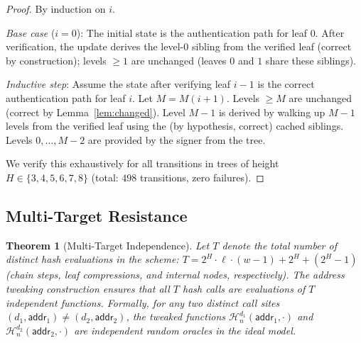 \documentclass[11pt]{article}
\newtheorem{theorem}{Theorem}
\newcommand{\hash}{\mathcal{H}}
\begin{document}
\begin{proof}
By induction on $i$.

\emph{Base case} ($i = 0$): The initial state is the authentication
path for leaf $0$. After verification, the update derives the level-$0$
sibling from the verified leaf (correct by construction); levels $\geq
1$ are unchanged (leaves $0$ and $1$ share these siblings).

\emph{Inductive step}: Assume the state after verifying leaf $i - 1$ is
the correct authentication path for leaf $i$. Let $M = M(i + 1)$.
Levels $\geq M$ are unchanged (correct by Lemma~\ref{lem:changed}).
Level $M - 1$ is derived by walking up $M - 1$ levels from the verified
leaf using the (by hypothesis, correct) cached siblings. Levels
$0, \ldots, M - 2$ are provided by the signer from the tree.

We verify this exhaustively for all transitions in trees of height
$H \in \{3, 4, 5, 6, 7, 8\}$ (total: $498$ transitions, zero
failures).
\end{proof}

\subsection{Multi-Target Resistance}

\begin{theorem}[Multi-Target Independence]\label{thm:multitarget}
Let $T$ denote the total number of distinct hash evaluations in the
scheme: $T = 2^H \cdot \ell \cdot (w - 1) + 2^H + (2^H - 1)$ (chain
steps, leaf compressions, and internal nodes, respectively). The
address tweaking construction ensures that all $T$ hash calls are
evaluations of $T$ \emph{independent functions}. Formally, for any two
distinct call sites $(d_1, \mathsf{addr}_1) \neq (d_2,
\mathsf{addr}_2)$, the tweaked functions
$\hash_n^{d_1}(\mathsf{addr}_1, \cdot)$ and
$\hash_n^{d_2}(\mathsf{addr}_2, \cdot)$ are independent random
oracles in the ideal model.
\end{theorem}
\end{document}
